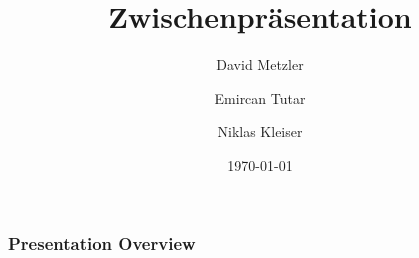 \documentclass[]{beamer}
\title[]{Zwischenpräsentation}
\author[shortname]{David Metzler \and Emircan Tutar  \and Niklas Kleiser}
\institute[shortinst]{ Hochschule Ravensburg Weingraten\\ \smallskip}
\date{ \today}
\begin{document}

\begin{frame}
	\titlepage %
\end{frame}



\begin{frame}
	\frametitle{Presentation Overview} %
	
	\tableofcontents %
\end{frame}

\end{document}
